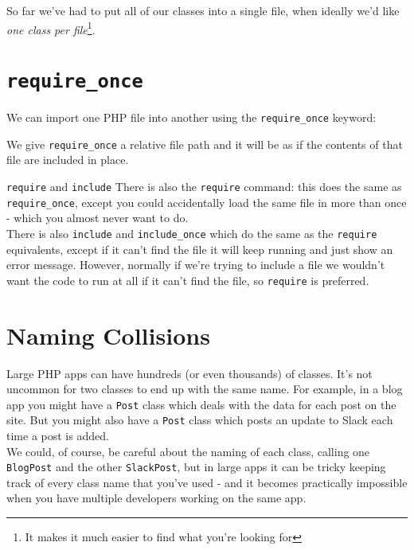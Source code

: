 So far we've had to put all of our classes into a single file, when ideally we'd like \textit{one class per file}\footnote{It makes it much easier to find what you're looking for}.

\section{\texttt{require\_once}}

We can import one PHP file into another using the \texttt{require\_once} keyword:


We give \texttt{require\_once} a relative file path and it will be as if the contents of that file are included in place.
\\

\begin{infobox}{\texttt{require} and \texttt{include}}
    There is also the \texttt{require} command: this does the same as \texttt{require\_once}, except you could accidentally load the same file in more than once - which you almost never want to do.
    \\

    There is also \texttt{include} and \texttt{include\_once} which do the same as the \texttt{require} equivalents, except if it can't find the file it will keep running and just show an error message. However, normally if we're trying to include a file we wouldn't want the code to run at all if it can't find the file, so \texttt{require} is preferred.
\end{infobox}



\section{Naming Collisions}

Large PHP apps can have hundreds (or even thousands) of classes. It's not uncommon for two classes to end up with the same name. For example, in a blog app you might have a \texttt{Post} class which deals with the data for each post on the site. But you might also have a \texttt{Post} class which posts an update to Slack each time a post is added.
\\

We could, of course, be careful about the naming of each class, calling one \texttt{BlogPost} and the other \texttt{SlackPost}, but in large apps it can be tricky keeping track of every class name that you've used - and it becomes practically impossible when you have multiple developers working on the same app.
\\

